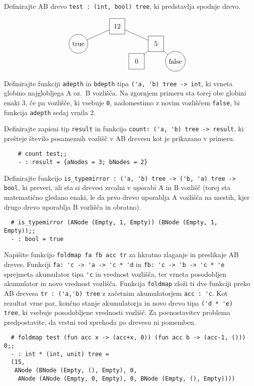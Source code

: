\documentclass[arhiv]{../izpit}
\begin{document}
  \podnaloga Definirajte AB drevo \verb|test : (int, bool) tree|, ki predstavlja spodnje drevo.
	
	\[
  \begin{tikzpicture}[level distance=0.9cm,
    level 1/.style={sibling distance=4cm},
    level 2/.style={sibling distance=2cm},
    level 3/.style={sibling distance=2cm}
    ]
    \node[minimum size=0.8cm, draw] {12}
      child {node[circle, draw] {true}}
      child {node[minimum size=0.8cm, draw] {5}
        child {node[minimum size=0.8cm, draw] {0}}
        child {node[circle, draw] {false}}
      };
  \end{tikzpicture}
  \]
	
	\podnaloga Definirajte funkciji \verb|adepth| in \verb|bdepth| tipa \verb|('a, 'b) tree -> int|, ki vrneta globino najglobljega A oz.\ B vozlišča. Na zgornjem primeru sta torej obe globini enaki 3, če pa vozlišče, ki vsebuje \verb|0|, nadomestimo z novim vozliščem \verb|false|, bi funkcija \verb|adepth| sedaj vrnila 2.
	
	\podnaloga Definirajte zapisni tip \verb|result| in funkcijo \verb|count: ('a, 'b) tree -> result|, ki prešteje število posameznih vozlišč v AB drevesu kot je prikazano v primeru.
	\begin{verbatim}
	# count test;;	
	- : result = {aNodes = 3; bNodes = 2}
	\end{verbatim}
	
	\podnaloga Definirajte funkcijo \verb|is_typemirror : ('a, 'b) tree -> ('b, 'a) tree -> bool|, ki preveri, ali sta si drevesi zrcalni v uporabi A in B vozlišč (torej sta matematično gledano enaki, le da prvo drevo uporablja A vozlišča na mestih, kjer drugo drevo uporablja B vozlišča in obratno).
  \begin{verbatim}
  # is_typemirror (ANode (Empty, 1, Empty)) (BNode (Empty, 1, Empty));;	
  - : bool = true
  \end{verbatim}
    
  \podnaloga Napišite funkcijo \verb|foldmap fa fb acc tr| za hkratno zlaganje in preslikaje AB dreves. Funkciji \verb|fa: 'c -> 'a -> 'c * 'd| in \verb|fb: 'c -> 'b -> 'c * 'e| sprejmeta akumulator tipa \verb|'c| in vrednost vozlišča, ter vrneta posodobljen akumulator in novo vrednost vozlišča. Funkcija \verb|foldmap| zloži ti dve funkciji preko AB drevesa \verb|tr : ('a,'b) tree| z začetnim akumulatorjem \verb|acc : 'c|. Kot rezultat vrne par, končno stanje akumulatorja in novo drevo tipa \verb|('d * 'e) tree|, ki vsebuje posodobljene vrednosti vozlišč. Za poenostavitev problema predpostavite, da vrstni red sprehoda po drevesu ni pomemben.
  \begin{verbatim}
  # foldmap test (fun acc x -> (acc+x, 0)) (fun acc b -> (acc-1, ())) 0;;  
  - : int * (int, unit) tree =
  (15, 
   ANode (BNode (Empty, (), Empty), 0,
    ANode (ANode (Empty, 0, Empty), 0, BNode (Empty, (), Empty))))
  \end{verbatim}
\end{document}
